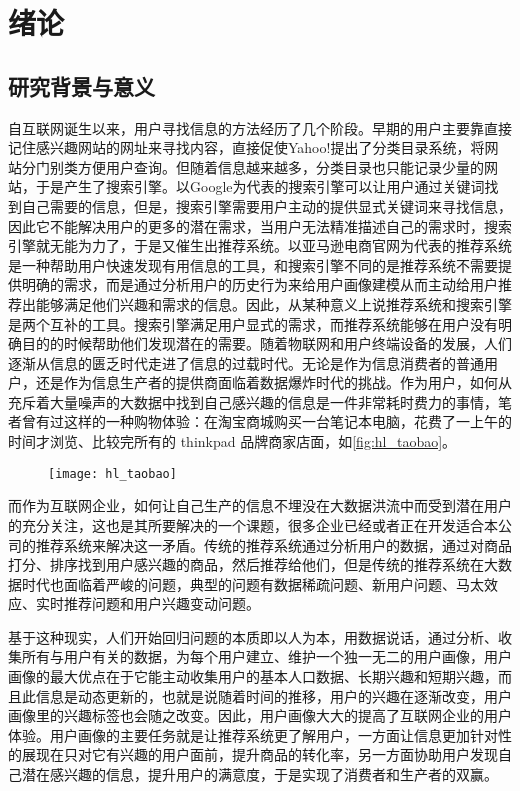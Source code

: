 ﻿
\chapter{绪论}
\label{chap:introduction}
\section{研究背景与意义}
	自互联网诞生以来，用户寻找信息的方法经历了几个阶段。早期的用户主要靠直接记住感兴趣网站的网址来寻找内容，直接促使Yahoo!提出了分类目录系统，将网站分门别类方便用户查询。但随着信息越来越多，分类目录也只能记录少量的网站，于是产生了搜索引擎。以Google为代表的搜索引擎可以让用户通过关键词找到自己需要的信息，但是，搜索引擎需要用户主动的提供显式关键词来寻找信息，因此它不能解决用户的更多的潜在需求，当用户无法精准描述自己的需求时，搜索引擎就无能为力了，于是又催生出推荐系统\citep{recmd-system}。以亚马逊电商官网为代表的推荐系统是一种帮助用户快速发现有用信息的工具，和搜索引擎不同的是推荐系统不需要提供明确的需求，而是通过分析用户的历史行为来给用户画像建模\citep{demo-data}从而主动给用户推荐出能够满足他们兴趣和需求的信息。因此，从某种意义上说推荐系统和搜索引擎是两个互补的工具。搜索引擎满足用户显式的需求，而推荐系统能够在用户没有明确目的的时候帮助他们发现潜在的需要。随着物联网和用户终端设备的发展，人们逐渐从信息的匮乏时代走进了信息的过载时代。无论是作为信息消费者的普通用户，还是作为信息生产者的提供商面临着数据爆炸时代的挑战。作为用户，如何从充斥着大量噪声的大数据中找到自己感兴趣的信息是一件非常耗时费力的事情，笔者曾有过这样的一种购物体验：在淘宝商城购买一台笔记本电脑，花费了一上午的时间才浏览、比较完所有的 thinkpad 品牌商家店面，如\autoref{fig:hl_taobao}。
	\begin{figure}
		\centering
		\texttt{[image: hl\_taobao]}
		\label{fig:hl_taobao}
	\end{figure}
	而作为互联网企业，如何让自己生产的信息不埋没在大数据洪流中而受到潜在用户的充分关注，这也是其所要解决的一个课题，很多企业已经或者正在开发适合本公司的推荐系统来解决这一矛盾。传统的推荐系统通过分析用户的数据，通过对商品打分、排序找到用户感兴趣的商品，然后推荐给他们，但是传统的推荐系统在大数据时代也面临着严峻的问题，典型的问题有数据稀疏问题、新用户问题、马太效应、实时推荐问题和用户兴趣变动问题。

	基于这种现实，人们开始回归问题的本质即以人为本，用数据说话，通过分析、收集所有与用户有关的数据，为每个用户建立、维护一个独一无二的用户画像，用户画像的最大优点在于它能主动收集用户的基本人口数据、长期兴趣和短期兴趣，而且此信息是动态更新的，也就是说随着时间的推移，用户的兴趣在逐渐改变，用户画像里的兴趣标签也会随之改变。因此，用户画像大大的提高了互联网企业的用户体验。用户画像的主要任务就是让推荐系统更了解用户，一方面让信息更加针对性的展现在只对它有兴趣的用户面前，提升商品的转化率，另一方面协助用户发现自己潜在感兴趣的信息，提升用户的满意度，于是实现了消费者和生产者的双赢。

